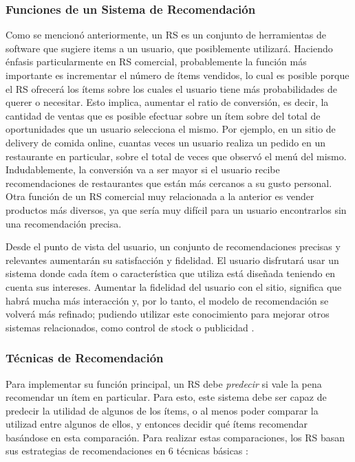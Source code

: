 \subsubsection{Funciones de un Sistema de Recomendación}
Como se mencionó anteriormente, un RS es un conjunto de herramientas de software que sugiere items a un usuario, que posiblemente utilizará. Haciendo énfasis particularmente en RS comercial, probablemente la función más importante es incrementar el número de ítems vendidos, lo cual es posible porque el RS ofrecerá los ítems sobre los cuales el usuario tiene más probabilidades de querer o necesitar. Esto implica, aumentar el ratio de conversión, es decir, la cantidad de ventas que es posible efectuar sobre un ítem sobre del total de oportunidades que un usuario selecciona el mismo. Por ejemplo, en un sitio de delivery de comida online, cuantas veces un usuario realiza un pedido en un restaurante en particular, sobre el total de veces que observó el menú del mismo. Indudablemente, la conversión va a ser mayor si el usuario recibe recomendaciones de restaurantes que están más cercanos a su gusto personal. Otra función de un RS comercial muy relacionada a la anterior es vender productos más diversos, ya que sería muy difícil para un usuario encontrarlos sin una recomendación precisa.

\bigskip Desde el punto de vista del usuario, un conjunto de recomendaciones precisas y relevantes aumentarán su satisfacción y fidelidad. El usuario disfrutará usar un sistema donde cada ítem o característica que utiliza está diseñada teniendo en cuenta sus intereses. Aumentar la fidelidad del usuario con el sitio, significa que habrá mucha más interacción y, por lo tanto, el modelo de recomendación se volverá más refinado; pudiendo utilizar este conocimiento para mejorar otros sistemas relacionados, como control de stock o publicidad \citep{ricci2011introduction}.

\subsubsection{Técnicas de Recomendación}
Para implementar su función principal, un RS debe \textit{predecir} si vale la pena recomendar un ítem en particular. Para esto, este sistema debe ser capaz de predecir la utilidad de algunos de los ítems, o al menos poder comparar la utilizad entre algunos de ellos, y entonces decidir qué ítems recomendar basándose en esta comparación. Para realizar estas comparaciones, los RS basan sus estrategias de recomendaciones en 6 técnicas básicas \citep{ricci2011introduction}:

